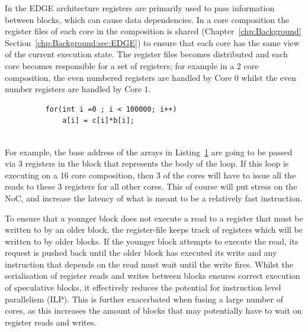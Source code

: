 In the EDGE architecture registers are primarily used to pass information between blocks, which can cause data dependencies.
In a core composition the register files of each core in the composition is shared (Chapter~\ref{chp:Background} Section~\ref{chp:Background:sec:EDGE}) to ensure that each core has the same view of the current execution state.
The register files becomes distributed and each core becomes responsible for a set of registers; for example in a 2 core composition, the even numbered registers are handled by Core 0 whilst the even number registers are handled by Core 1.

\begin{figure}[t]
\lstset{language=C,numbersep=4pt}
\begin{center}
\begin{lstlisting}
	for(int i =0 ; i < 100000; i++)
		a[i] = c[i]*b[i];
	
\end{lstlisting}
\end{center}
\vspace{-1em}
\label{lst:basic2}
\vspace{3em}
\end{figure}

For example, the base address of the arrays in Listing~\ref{lst:basic2} are going to be passed via 3 registers in the block that represents the body of the loop.
If this loop is executing on a 16 core composition, then 3 of the cores will have to issue all the reads to these 3 registers for all other cores.
This of course will put stress on the NoC, and increase the latency of what is meant to be a relatively fast instruction.

To ensure that a younger block does not execute a read to a register that must be written to by an older block, the register-file keeps track of registers which will be written to by older blocks.
If the younger block attempts to execute the read, its request is pushed back until the older block has executed its write and any instruction that depends on the read must wait until the write fires.
Whilst the serialisation of register reads and writes between blocks ensures correct execution of speculative blocks, it effectively reduces the potential for instruction level parallelism (ILP).
This is further exacerbated when fusing a large number of cores, as this increases the amount of blocks that may potentially have to wait on register reads and writes.

